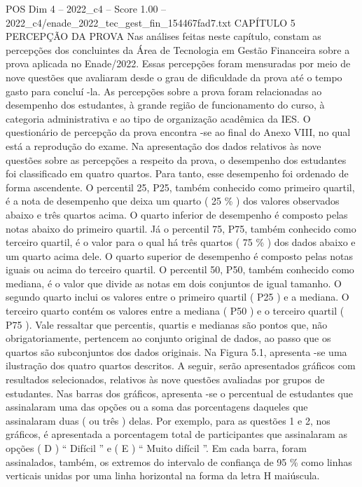 \begin{textsample}{POS Dim 4 – 2022\_c4 – Score 1.00 – 2022\_c4/enade\_2022\_tec\_gest\_fin\_154467fad7.txt}  \label{ex:f4_pos_145}
CAPÍTULO 5 PERCEPÇÃO DA PROVA Nas análises feitas neste capítulo, constam as percepções dos concluintes da Área de Tecnologia em Gestão Financeira sobre a prova aplicada no Enade/2022.
Essas percepções foram mensuradas por meio de nove questões que avaliaram desde o grau de dificuldade da prova até o tempo gasto para concluí -la.
As percepções sobre a prova foram relacionadas ao desempenho dos estudantes, à grande região de funcionamento do curso, à categoria administrativa e ao tipo de organização acadêmica da IES.
O questionário de percepção da prova encontra -se ao final do Anexo VIII, no qual está a reprodução do exame.
Na apresentação dos dados relativos às nove questões sobre as percepções a respeito da prova, o desempenho dos estudantes foi classificado em quatro quartos.
Para tanto, esse desempenho foi ordenado de forma ascendente.
O percentil 25, P25, também conhecido como primeiro quartil, é a nota de desempenho que deixa um quarto ( 25 \% ) dos valores observados abaixo e três quartos acima.
O quarto inferior de desempenho é composto pelas notas abaixo do primeiro quartil.
Já o percentil 75, P75, também conhecido como terceiro quartil, é o valor para o qual há três quartos ( 75 \% ) dos dados abaixo e um quarto acima dele.
O quarto superior de desempenho é composto pelas notas iguais ou acima do terceiro quartil.
O percentil 50, P50, também conhecido como mediana, é o valor que divide as notas em dois conjuntos de igual tamanho.
O segundo quarto inclui os valores entre o primeiro quartil ( P25 ) e a mediana.
O terceiro quarto contém os valores entre a mediana ( P50 ) e o terceiro quartil ( P75 ).
Vale ressaltar que percentis, quartis e medianas são pontos que, não obrigatoriamente, pertencem ao conjunto original de dados, ao passo que os quartos são subconjuntos dos dados originais.
Na Figura 5.1, apresenta -se uma ilustração dos quatro quartos descritos.
A seguir, serão apresentados gráficos com resultados selecionados, relativos às nove questões avaliadas por grupos de estudantes.
Nas barras dos gráficos, apresenta -se o percentual de estudantes que assinalaram uma das opções ou a soma das porcentagens daqueles que assinalaram duas ( ou três ) delas.
Por exemplo, para as questões 1 e 2, nos gráficos, é apresentada a porcentagem total de participantes que assinalaram as opções ( D ) “ Difícil ” e ( E ) “ Muito difícil ”.
Em cada barra, foram assinalados, também, os extremos do intervalo de confiança de 95 \% como linhas verticais unidas por uma linha horizontal na forma da letra H maiúscula.

\end{textsample}
